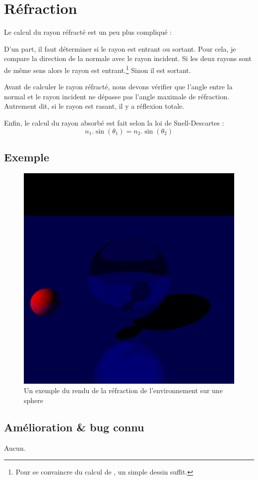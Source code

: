 \section{Réfraction}
Le calcul du rayon réfracté est un peu plus compliqué :
\begin{center}
\end{center}

D'un part, il faut déterminer si le rayon est entrant ou sortant. Pour cela,
je compare la direction de la normale avec le rayon incident. Si les deux
rayons sont de même sens alors le rayon est entrant.\footnote{Pour se
convaincre du calcul de , un simple dessin suffit.} Sinon il est
sortant.

Avant de calculer le rayon réfracté, nous devons vérifier que l'angle entre
la normal et le rayon incident ne dépasse pas l'angle maximale de réfraction.
Autrement dit, si le rayon est rasant, il y a réflexion totale.

Enfin, le calcul du rayon absorbé est fait selon la loi de Snell-Descartes :
$$n_1.\sin(\theta_1) = n_2.\sin(\theta_2)$$

\subsection{Exemple}
\begin{figure}[h]
  \includegraphics[width=\textwidth, keepaspectratio=true]{../../diary/09.png}
  \caption{Un exemple du rendu de la réfraction de l'environnement sur une
  sphere}
\end{figure}

\subsection{Amélioration \& bug connu}
Aucun.
